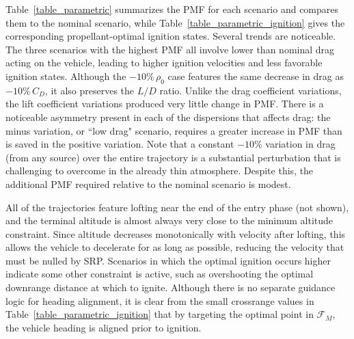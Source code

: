 Table~\ref{table_parametric} summarizes the PMF for each scenario and compares them to the nominal scenario, while Table~\ref{table_parametric_ignition} gives the corresponding propellant-optimal ignition states. Several trends are noticeable. The three scenarios with the highest PMF all involve lower than nominal drag acting on the vehicle, leading to higher ignition velocities and less favorable ignition states. Although the $-10\%\, \rho_0$ case features the same decrease in drag as $-10\%\,C_D$, it also preserves the $L/D$ ratio. Unlike the drag coefficient variations, the lift coefficient variations produced very little change in PMF.
There is a noticeable asymmetry present in each of the dispersions that affects drag: the minus variation, or ``low drag" scenario, requires a greater increase in PMF than is saved in the positive variation. Note that a constant $-10\%$ variation in drag (from any source) over the entire trajectory is a substantial perturbation that is challenging to overcome in the already thin atmosphere. Despite this, the additional PMF required relative to the nominal scenario is modest.

All of the trajectories feature lofting near the end of the entry phase (not shown), and the terminal altitude is almost always very close to the minimum altitude constraint. Since altitude decreases monotonically with velocity after lofting, this allows the vehicle to decelerate for as long as possible, reducing the velocity that must be nulled by SRP. Scenarios in which the optimal ignition occurs higher indicate some other constraint is active, such as overshooting the optimal downrange distance at which to ignite. Although there is no separate guidance logic for heading alignment, it is clear from the small crossrange values in Table~\ref{table_parametric_ignition} that by targeting the optimal point in $\mathcal{F}_M$, the vehicle heading is aligned prior to ignition. 

